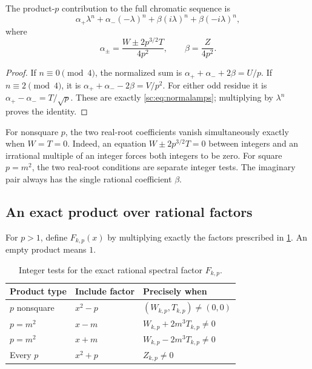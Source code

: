 \documentclass[11pt,a4paper]{article}
\numberwithin{equation}{section}
\theoremstyle{definition}
\theoremstyle{remark}
\begin{document}
\begin{lemma}\label{sc:lem:fourier}
The product-$p$ contribution to the full chromatic sequence is
\begin{equation}\label{sc:eq:fourier}
 \alpha_+\lambda^n+\alpha_-(-\lambda)^n
       +\beta(i\lambda)^n+\beta(-i\lambda)^n,
\end{equation}
where
\begin{equation}\label{sc:eq:fouriercoeff}
 \alpha_\pm=\frac{W\pm2p^{3/2}T}{4p^2},\qquad
 \beta=\frac Z{4p^2}.
\end{equation}
\end{lemma}
\begin{proof}
If $n\equiv0\pmod4$, the normalized sum is
$\alpha_++\alpha_-+2\beta=U/p$.
If $n\equiv2\pmod4$, it is
$\alpha_++\alpha_--2\beta=V/p^2$.
For either odd residue it is
$\alpha_+-\alpha_-=T/\sqrt p$.
These are exactly \eqref{sc:eq:normalamps}; multiplying by $\lambda^n$
proves the identity.
\end{proof}

For nonsquare $p$, the two real-root coefficients vanish simultaneously
exactly when $W=T=0$. Indeed, an equation
$W\pm2p^{3/2}T=0$ between integers and an irrational multiple of an integer
forces both integers to be zero. For square $p=m^2$, the two real-root
conditions are separate integer tests. The imaginary pair always has the
single rational coefficient $\beta$.

\subsection{An exact product over rational factors}
For $p>1$, define $F_{k,p}(x)$ by multiplying exactly the factors prescribed
in \cref{sc:tab:factor}. An empty product means $1$.

\begin{table}[htbp]
\centering
\begin{tabular}{@{}lll@{}}
\toprule
Product type & Include factor & Precisely when\\
\midrule
$p$ nonsquare & $x^2-p$ & $(W_{k,p},T_{k,p})\ne(0,0)$\\
$p=m^2$ & $x-m$ & $W_{k,p}+2m^3T_{k,p}\ne0$\\
$p=m^2$ & $x+m$ & $W_{k,p}-2m^3T_{k,p}\ne0$\\
Every $p$ & $x^2+p$ & $Z_{k,p}\ne0$\\
\bottomrule
\end{tabular}
\caption{Integer tests for the exact rational spectral factor $F_{k,p}$.}
\label{sc:tab:factor}
\end{table}
\end{document}
